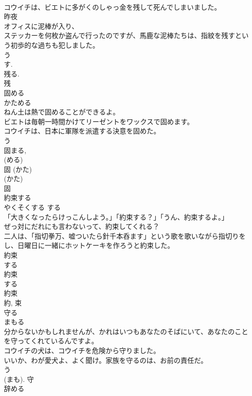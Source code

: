 \documentclass[8pt]{extreport}
\begin{document}
\begin{CJK}{UTF8}{min}
\\	コウイチは、ビエトに多がくのしゃっ金を残して死んでしまいました。	
\\	昨夜
\\	オフィスに泥棒が入り、
\\	ステッカーを何枚か盗んで行ったのですが、馬鹿な泥棒たちは、指紋を残すという初歩的な過ちも犯しました。	
\\	う 
\\	す. 
\\	残る. 
\\	残	
\\	固める	
\\	かためる	
\\	ねん土は熱で固めることができるよ。	
\\	ビエトは毎朝一時間かけてリーゼントをワックスで固めます。	
\\	コウイチは、日本に軍隊を派遣する決意を固めた。	
\\	う 
\\	固まる, 
\\	(める) 
\\	固 (かた) 
\\	(かた) 
\\	固	
\\	約束する	
\\	やくそくする	する 
\\	「大きくなったらけっこんしよう。」「約束する？」「うん、約束するよ。」	
\\	ぜっ対にだれにも言わないって、約束してくれる？	
\\	二人は、「指切拳万、嘘ついたら針千本呑ます」という歌を歌いながら指切りをし、日曜日に一緒にホットケーキを作ろうと約束した。	
\\	約束 
\\	する 
\\	約束 
\\	する 
\\	約束 
\\	約, 束	
\\	守る	
\\	まもる	
\\	分からないかもしれませんが、かれはいつもあなたのそばにいて、あなたのことを守ってくれているんですよ。	
\\	コウイチの犬は、コウイチを危険から守りました。	
\\	いいか、わが愛犬よ、よく聞け。家族を守るのは、お前の責任だ。	
\\	う 
\\	(まも).	守	
\\	辞める	

\end{CJK}
\end{document}
